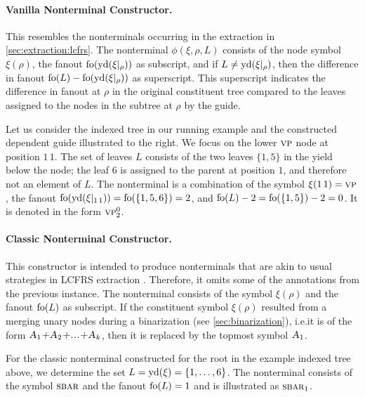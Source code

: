 \documentclass[../../document.tex]{subfiles}
\begin{document}
    \paragraph{Vanilla Nonterminal Constructor.}
    This resembles the nonterminals occurring in the extraction in \cref{sec:extraction:lcfrs}.
    The nonterminal \(\phi(\xi, \rho, L)\) consists of the node symbol \(\xi(\rho)\), the fanout \(\operatorname{fo}(\operatorname{yd}(\xi|_\rho))\) as subscript, and if \(L \neq \operatorname{yd}(\xi|_\rho)\), then the difference in fanout \(\operatorname{fo}(L) - \operatorname{fo}(\operatorname{yd}(\xi|_\rho))\) as superscript.
    This superscript indicates the difference in fanout at \(\rho\) in the original constituent tree compared to the leaves assigned to the nodes in the subtree at \(\rho\) by the guide.

    \begin{wrapfigure}[6]{r}{0pt}
        
    \end{wrapfigure}
    Let us consider the indexed tree in our running example and the constructed dependent guide illustrated to the right.
    We focus on the lower \(\textsc{vp}\) node at position \(1\,1\).
    The set of leaves \(L\) consists of the two leaves \(\{1,5\}\) in the yield below the node; the leaf \(6\) is assigned to the parent at position \(1\), and therefore not an element of \(L\).
    The nonterminal is a combination of the symbol \(\xi(1\,1) = \textsc{vp}\), the fanout \(\operatorname{fo}(\operatorname{yd}(\xi|_{1\,1})) = \operatorname{fo}(\{1,5,6\}) = 2\), and \(\operatorname{fo}(L) - 2 = \operatorname{fo}(\{1,5\})-2=0\).
    It is denoted in the form \(\textsc{vp}^0_2\).

    \paragraph{Classic Nonterminal Constructor.}
    This constructor is intended to produce nonterminals that are akin to usual strategies in LCFRS extraction \cite{MaierSogaard08}.
    Therefore, it omits some of the annotations from the previous instance.
    The nonterminal consists of the symbol \(\xi(\rho)\) and the fanout \(\operatorname{fo}(L)\) as subscript.
    If the constituent symbol \(\xi(\rho)\) resulted from a merging unary nodes during a binarization (see \cref{sec:binarization}), i.e.\@ it is of the form \(\textsc{\textsl{A$_1$+A$_2$+...+A$_k$}}\), then it is replaced by the topmost symbol \(\textsc{\textsl{A}}_1\).

    For the classic nonterminal constructed for the root in the example indexed tree above, we determine the set \(L = \operatorname{yd}(\xi) = \{1,\ldots,6\}\).
    The nonterminal consists of the symbol \(\textsc{sbar}\) and the fanout \(\operatorname{fo}(L) = 1\) and is illustrated as \(\textsc{sbar}_1\).
\end{document}
